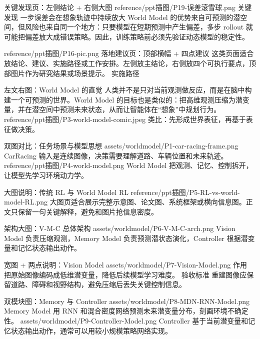 \documentclass[aspectratio=169]{beamer}
\newcommand{\wmasset}[1]{reference/ppt插图/#1}
\newcommand{\wmgen}[1]{assets/worldmodel/#1}
\begin{document}
\WinterFindingFrame
  {关键发现页：左侧结论 + 右侧大图}
  {\wmasset{P19-误差滚雪球.png}}
  {关键发现}
  {一步误差会在想象轨迹中持续放大}
  {World Model 的优势来自可预测的潜空间，但风险也来自同一个地方：只要模型在短期预测中产生偏差，多步 rollout 就可能把偏差放大成错误策略。因此，训练策略前必须先验证动态模型的稳定性。}

\WinterRecommendationFrame
  {\wmasset{P16-pic.png}}
  {落地建议页：顶部横幅 + 四点建议}
  {这类页面适合放结论、建议、实施路径或工作安排。左侧放主结论，右侧放四个可执行要点，顶部图片作为研究结果或场景提示。}
  {实施路径}
  {%
  }


\WinterTextImageFrame
  {左文右图：World Model 的直觉}
  {人类并不是只对当前观测做反应，而是在脑中构建一个可预测的世界。World Model 的目标也是类似的：把高维观测压缩为潜变量，并在潜空间中预测未来状态，从而让智能体在“想象”中规划行为。}
  {\wmasset{P3-world-model-comic.jpeg}}
  {类比：先形成世界表征，再基于表征做决策。}

\WinterTwoImageCompareFrame
  {双图对比：任务场景与模型思想}
  {\wmgen{P1-car-racing-frame.png}}
  {CarRacing 输入是连续图像，决策需要理解道路、车辆位置和未来轨迹。}
  {\wmasset{P4-world-model.png}}
  {World Model 把观测、记忆、控制拆开，让模型先学习环境动力学。}

\WinterWideImageFrame
  {大图说明：传统 RL 与 World Model RL}
  {\wmasset{P5-RL-vs-world-model-RL.png}}
  {大图页适合展示完整示意图、论文图、系统框架或横向信息图。正文只保留一句关键解释，避免和图片抢信息密度。}


\WinterArchitectureFrame
  {架构大图：V-M-C 总体架构}
  {\wmgen{P6-V-M-C-arch.png}}
  {Vision Model 负责压缩观测，Memory Model 负责预测潜状态演化，Controller 根据潜变量和记忆状态输出动作。}

\WinterArchitecturePointsFrame
  {宽图 + 两点说明：Vision Model}
  {\wmgen{P7-Vision-Model.png}}
  {作用}
  {把原始图像编码成低维潜变量，降低后续模型学习难度。}
  {验收标准}
  {重建图像应保留道路、障碍和视野结构，避免压缩后丢失关键控制信息。}

\WinterDualArchitectureFrame
  {双模块图：Memory 与 Controller}
  {\wmgen{P8-MDN-RNN-Model.png}}
  {Memory Model}
  {用 RNN 和混合密度网络预测未来潜变量分布，刻画环境不确定性。}
  {\wmgen{P9-Controller-Model.png}}
  {Controller}
  {基于当前潜变量和记忆状态输出动作，通常可以用较小规模策略网络实现。}
\end{document}
